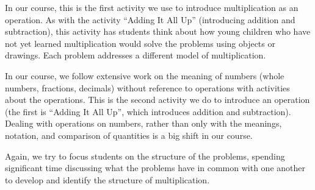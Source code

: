 \documentclass[nooutcomes,noauthor,handout]{ximera}
\begin{document}
\newpage
\begin{instructorNotes}
In our course, this is the first activity we use to introduce multiplication as an operation.  As with the activity ``Adding It All Up'' (introducing addition and subtraction), this activity has students think about how young children who have not yet learned multiplication would solve the problems using objects or drawings.  Each problem addresses a different model of multiplication.

In our course, we follow extensive work on the meaning of numbers (whole numbers, fractions, decimals) without reference to operations with activities about the operations.  This is the second activity we do to introduce an operation (the first is ``Adding It All Up'', which introduces addition and subtraction). Dealing with operations on numbers, rather than only with the meanings, notation, and comparison of quantities is a big shift in our course.

Again, we try to focus students on the structure of the problems, spending significant time discussing what the problems have in common with one another to develop and identify the structure of multiplication.


\end{instructorNotes}
\end{document}
